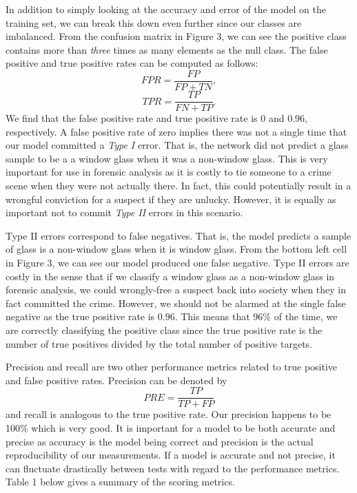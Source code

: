 \documentclass[12pt,halfline,a4paper]{ouparticle}
\begin{document}
In addition to simply looking at the accuracy and error of the model on the training set, we can break this down even further since our classes are imbalanced. From the confusion matrix in Figure 3, we can see the positive class contains more than \emph{three} times as many elements as the null class. The false positive and true positive rates can be computed as follows: 
\begin{equation}
FPR = \frac{FP}{FP + TN} , 
\end{equation}
\begin{equation}
TPR = \frac{TP}{FN + TP}.
\end{equation}
We find that the false positive rate and true positive rate is 0 and 0.96, respectively. A false positive rate of zero implies there was not a single time that our model committed a \emph{Type I} error. That is, the network did not predict a glass sample to be a a window glass when it was a non-window glass. This is very important for use in forensic analysis as it is costly to tie someone to a crime scene when they were not actually there. In fact, this could potentially result in a wrongful conviction for a suspect if they are unlucky. However, it is equally as important not to commit \emph{Type II} errors in this scenario. 

Type II errors correspond to false negatives. That is, the model predicts a sample of glass is a non-window glass when it is window glass. From the bottom left cell in Figure 3, we can see our model produced one false negative. Type II errors are costly in the sense that if we classify a window glass as a non-window glass in forensic analysis, we could wrongly-free a suspect back into society when they in fact committed the crime. However, we should not be alarmed at the single false negative as the true positive rate is 0.96. This means that 96\% of the time, we are correctly classifying the positive class since the true positive rate is the number of true positives divided by the total number of positive targets. 

Precision and recall are two other performance metrics related to true positive and false positive rates. Precision can be denoted by 
\begin{equation}
PRE = \frac{TP}{TP + FP}
\end{equation}
and recall is analogous to the true positive rate. Our precision happens to be 100\% which is very good. It is important for a model to be both accurate and precise as accuracy is the model being correct and precision is the actual reproducibility of our measurements. If a model is accurate and not precise, it can fluctuate drastically between tests with regard to the performance metrics. Table 1 below gives a summary of the scoring metrics. 
\end{document}
